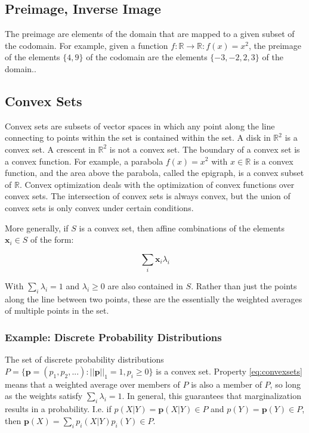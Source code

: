\subsection{Preimage, Inverse Image}
\label{sec:preimage}
The preimage are elements of the domain that are mapped to a given subset of the codomain. For example, given a function $f:\mathbb{R} \rightarrow \mathbb{R}: f(x) = x^2$, the preimage of the elements $\{4,9\}$ of the codomain are the elements $\{-3,-2,2,3\}$ of the domain..


\subsection{Convex Sets}
Convex sets are subsets of vector spaces in which any point along the line connecting to points within the set is contained within the set. A disk in $\mathbb{R}^2$ is a convex set. A crescent in $\mathbb{R}^2$ is not a convex set. The boundary of a convex set is a convex function. For example, a parabola $f(x) = x^2$ with $x\in\mathbb{R}$ is a convex function, and the area above the parabola, called the epigraph, is a convex subset of $\mathbb{R}$. Convex optimization deals with the optimization of convex functions over convex sets. The intersection of convex sets is always convex, but the union of convex sets is only convex under certain conditions. 

More generally, if $S$ is a convex set, then affine combinations of the elements $\mathbf{x}_i  \in S$ of the form:

\begin{equation}
\sum_i \mathbf{x}_i \lambda_i 
\label{eq:convexsets}
\end{equation}  

With $\sum_i \lambda_i = 1$ and $\lambda_i\geq 0$ are also contained in $S$. Rather than just the points along the line between two points, these are the essentially the weighted averages of multiple points in the set.  

\subsubsection{Example: Discrete Probability Distributions}
The set of discrete probability distributions $P = \{ \mathbf{p}=(p_1,p_2,...): ||\mathbf{p}||_1 = 1, p_i \geq 0\}$ is a convex set. Property \ref{eq:convexsets} means that a weighted average over members of $P$ is also a member of $P$, so long as the weights satisfy $\sum_i \lambda_i = 1$. In general, this guarantees that marginalization results in a probability. I.e. if $p(X|Y) = \mathbf{p}(X|Y) \in P$ and $p(Y) = \mathbf{p}(Y) \in P$, then $\mathbf{p}(X) = \sum_i p_i(X|Y) p_i(Y) \in P$. 

